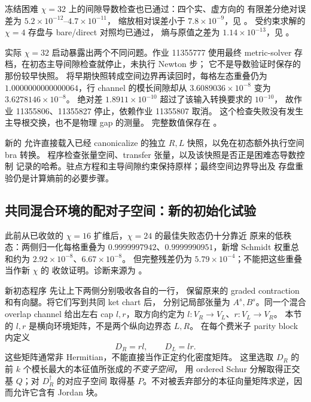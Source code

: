 冻结困难 $\chi=32$ 上的间隙导数检查也已通过：四个实、虚方向的
有限差分绝对误差为 $5.2\times10^{-12}$--$4.7\times10^{-11}$，
缩放相对误差小于 $7.8\times10^{-9}$，见
。
受约束求解的 $\chi=4$ 存盘与 bare/direct 对照均已通过，
熵与原值之差为 $1.14\times10^{-13}$，见
。

实际 $\chi=32$ 启动暴露出两个不同问题。作业 11355777 使用最终
metric-solver 存档，在初态主导间隙检查就停止，未执行 Newton 步；
它不是导数验证时保存的那份较早快照。
将早期快照转成空间边界再读回时，每格左态重叠仍为
$1.0000000000000064$，行 channel 的模长间隙却从
$3.6089036\times10^{-8}$ 变为 $3.6278146\times10^{-8}$。
绝对差 $1.8911\times10^{-10}$ 超过了该输入转换要求的 $10^{-10}$，
故作业 11355806、11355827 停止，依赖作业 11355807 取消。
这个检查失败没有发生主导根交换，也不是物理 gap 的测量。
完整数值保存在 。

新的  允许直接载入已经 canonicalize
的独立 $R,L$ 快照，以免在初态额外执行空间 bra 转换。
程序检查张量空间、transfer 张量，以及该快照是否正是困难态导数控制
记录的哈希。驻点方程和主导间隙约束保持原样；最终空间边界导出及
存盘重验仍是计算熵前的必要步骤。

\subsection{共同混合环境的配对子空间：新的初始化试验}
此前从已收敛的 $\chi=16$ 扩维后，$\chi=24$ 的最佳失败态仍十分靠近
原来的低秩态：两侧归一化每格重叠为
$0.9999997942$、$0.9999990951$，新增 Schmidt 权重总和约为
$2.92\times10^{-8}$、$6.67\times10^{-8}$。
但完整残差仍为 $5.79\times10^{-4}$；不能把这些重叠当作新 $\chi$ 的
收敛证明。诊断来源为 。

新初态程序  先让上下两侧分别吸收各自的一行，
保留原来的 graded contraction 和有向腿。将它们写到共同 ket chart 后，
分别记局部张量为 $A^s,B^s$。同一个混合 overlap channel 给出左右 cap
$l,r$，取方向约定为 $l:V_R\to V_L$、$r:V_L\to V_R$。
本节的 $l,r$ 是横向环境矩阵，不是两个纵向边界态 $L,R$。
在每个费米子 parity block 内定义
\begin{equation}
 D_R=rl,\qquad D_L=lr.
\end{equation}
这些矩阵通常非 Hermitian，不能直接当作正定约化密度矩阵。
这里选取 $D_R$ 的前 $k$ 个模长最大的本征值所张成的\emph{不变子空间}，
用 ordered Schur 分解取得正交基 $Q$；对 $D_R^\dagger$ 的对应子空间
取得基 $P$。不对被丢弃部分的本征向量矩阵求逆，因而允许它含有 Jordan 块。

